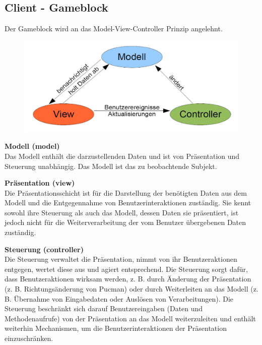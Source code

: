 \documentclass[11pt,a4paper]{article}
\begin{document}
\subsection{Client - Gameblock}
Der Gameblock wird an das Model-View-Controller Prinzip angelehnt. \par\bigskip
\begin{figure}[htb]
  \centering
  \includegraphics[scale=0.2]{mvc.jpg}
  \label{PNFs}
\end{figure} 




\textbf{Modell (model)} \\
Das Modell enthält die darzustellenden Daten und ist von Präsentation und Steuerung unabhängig. Das Modell ist das zu beobachtende Subjekt.\\

\par\bigskip \par\bigskip
\textbf{Präsentation (view)} \\
Die Präsentationsschicht ist für die Darstellung der benötigten Daten aus dem Modell und die Entgegennahme von Benutzerinteraktionen zuständig. Sie kennt sowohl ihre Steuerung als auch das Modell, dessen Daten sie präsentiert, ist jedoch nicht für die Weiterverarbeitung der vom Benutzer übergebenen Daten zuständig. \\

\par\bigskip \par\bigskip
\textbf{Steuerung (controller)} \\
Die Steuerung verwaltet die Präsentation, nimmt von ihr Benutzeraktionen entgegen, wertet diese aus und agiert entsprechend. Die Steuerung sorgt dafür, dass Benutzeraktionen wirksam werden, z. B. durch Änderung der Präsentation (z. B. Richtungsänderung von Pucman) oder durch Weiterleiten an das Modell (z. B. Übernahme von Eingabedaten oder  Auslösen von Verarbeitungen). Die Steuerung beschränkt sich darauf Benutzereingaben (Daten und Methodenaufrufe) von der Präsentation an das Modell weiterzuleiten und enthält weiterhin Mechanismen, um die Benutzerinteraktionen der Präsentation einzuschränken.
\end{document}
